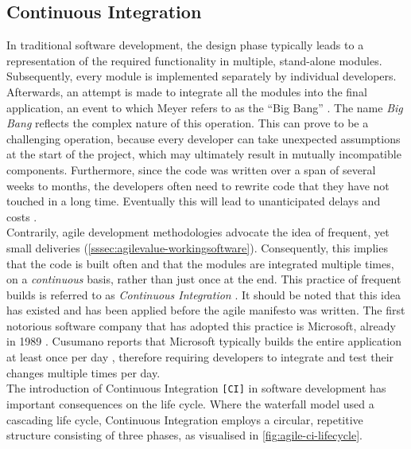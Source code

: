 
\subsection{Continuous Integration}
In traditional software development, the design phase typically leads to a representation of the required functionality in multiple, stand-alone modules. Subsequently, every module is implemented separately by individual developers. Afterwards, an attempt is made to integrate all the modules into the final application, an event to which Meyer refers to as the ``Big Bang'' \cite[~p.103]{Meyer2014}. The name \emph{Big Bang} reflects the complex nature of this operation. This can prove to be a challenging operation, because every developer can take unexpected assumptions at the start of the project, which may ultimately result in mutually incompatible components. Furthermore, since the code was written over a span of several weeks to months, the developers often need to rewrite code that they have not touched in a long time. Eventually this will lead to unanticipated delays and costs \cite{SmartJenkinsDefinitive}.\\ 

\noindent Contrarily, agile development methodologies advocate the idea of frequent, yet small deliveries (\autoref{sssec:agilevalue-workingsoftware}). Consequently, this implies that the code is built often and that the modules are integrated multiple times, on a \emph{continuous} basis, rather than just once at the end. This practice of frequent builds is referred to as \emph{Continuous Integration} \cite{martin2014,Meyer2014}. It should be noted that this idea has existed and has been applied before the agile manifesto was written. The first notorious software company that has adopted this practice is Microsoft, already in 1989 \cite[~p.11]{cusumanomicrosoft}. Cusumano reports that Microsoft typically builds the entire application at least once per day \cite[~p.12]{cusumanomicrosoft}, therefore requiring developers to integrate and test their changes multiple times per day.\\

\noindent The introduction of Continuous Integration \texttt{[CI]} in software development has important consequences on the life cycle. Where the waterfall model used a cascading life cycle, Continuous Integration employs a circular, repetitive structure consisting of three phases, as visualised in \autoref{fig:agile-ci-lifecycle}.

